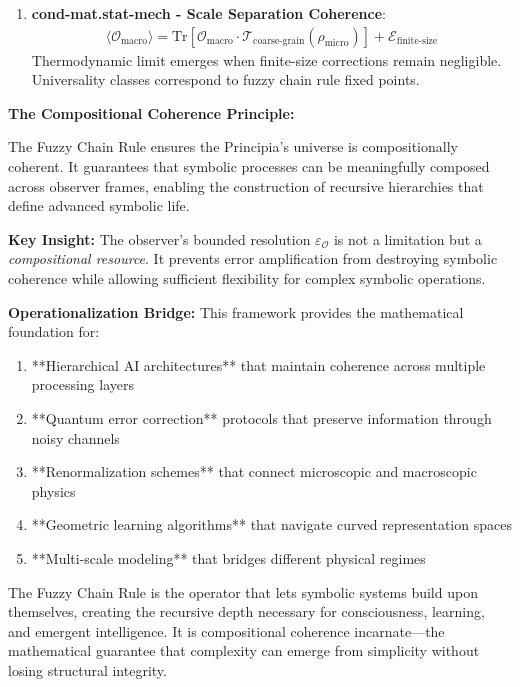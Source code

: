 \begin{scholium}
\begin{enumerate}
\item \textbf{cond-mat.stat-mech - Scale Separation Coherence}:
   \begin{align}
   \langle \mathcal{O}_{\text{macro}} \rangle = \text{Tr}[\mathcal{O}_{\text{macro}} \cdot \mathcal{T}_{\text{coarse-grain}}(\rho_{\text{micro}})] + \mathcal{E}_{\text{finite-size}}
   \end{align}
   Thermodynamic limit emerges when finite-size corrections remain negligible. Universality classes correspond to fuzzy chain rule fixed points.
\end{enumerate}
\end{scholium}

\textbf{The Compositional Coherence Principle:}

The Fuzzy Chain Rule ensures the Principia's universe is compositionally coherent. It guarantees that symbolic processes can be meaningfully composed across observer frames, enabling the construction of recursive hierarchies that define advanced symbolic life.

\textbf{Key Insight:} The observer's bounded resolution $\varepsilon_{\mathcal{O}}$ is not a limitation but a \textit{compositional resource}. It prevents error amplification from destroying symbolic coherence while allowing sufficient flexibility for complex symbolic operations.

\textbf{Operationalization Bridge:}
This framework provides the mathematical foundation for:
\begin{enumerate}
\item **Hierarchical AI architectures** that maintain coherence across multiple processing layers
\item **Quantum error correction** protocols that preserve information through noisy channels  
\item **Renormalization schemes** that connect microscopic and macroscopic physics
\item **Geometric learning algorithms** that navigate curved representation spaces
\item **Multi-scale modeling** that bridges different physical regimes
\end{enumerate}

The Fuzzy Chain Rule is the operator that lets symbolic systems build upon themselves, creating the recursive depth necessary for consciousness, learning, and emergent intelligence. It is compositional coherence incarnate—the mathematical guarantee that complexity can emerge from simplicity without losing structural integrity.

